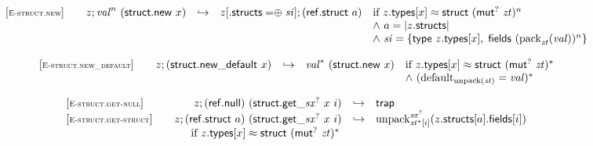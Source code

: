 $$
\begin{array}[t]{@{}lrcl@{}l@{}}
{[\textsc{\scriptsize E{-}struct.new}]} \quad & z ; {{\mathit{val}}^{n}}~(\mathsf{struct{.}new}~x) & \hookrightarrow & z{}[{.}\mathsf{structs} \mathrel{{=}{\oplus}} {\mathit{si}}] ; (\mathsf{ref{.}struct}~a) & \quad
\begin{array}[t]{@{}l@{}}
\mbox{if}~ z{.}\mathsf{types}{}[x] \approx \mathsf{struct}~{({\mathsf{mut}^?}~{\mathit{zt}})^{n}} \\
{\land}~ a = {|z{.}\mathsf{structs}|} \\
{\land}~ {\mathit{si}} = \{ \mathsf{type}~z{.}\mathsf{types}{}[x],\;\allowbreak \mathsf{fields}~{({{\mathrm{pack}}}_{{\mathit{zt}}}({\mathit{val}}))^{n}} \} \\
\end{array} \\
\end{array}
$$

$$
\begin{array}[t]{@{}lrcl@{}l@{}}
{[\textsc{\scriptsize E{-}struct.new\_default}]} \quad & z ; (\mathsf{struct{.}new\_default}~x) & \hookrightarrow & {{\mathit{val}}^\ast}~(\mathsf{struct{.}new}~x) & \quad
\begin{array}[t]{@{}l@{}}
\mbox{if}~ z{.}\mathsf{types}{}[x] \approx \mathsf{struct}~{({\mathsf{mut}^?}~{\mathit{zt}})^\ast} \\
{\land}~ ({{\mathrm{default}}}_{{\mathrm{unpack}}({\mathit{zt}})} = {\mathit{val}})^\ast \\
\end{array} \\
\end{array}
$$

\vspace{1ex}

$$
\begin{array}[t]{@{}lrcl@{}l@{}}
{[\textsc{\scriptsize E{-}struct.get{-}null}]} \quad & z ; (\mathsf{ref{.}null})~({\mathsf{struct{.}get}}{\mathsf{\_}}{{{\mathit{sx}}^?}}~x~i) & \hookrightarrow & \mathsf{trap} \\
{[\textsc{\scriptsize E{-}struct.get{-}struct}]} \quad & z ; (\mathsf{ref{.}struct}~a)~({\mathsf{struct{.}get}}{\mathsf{\_}}{{{\mathit{sx}}^?}}~x~i) & \hookrightarrow & {{{{\mathrm{unpack}}}_{{{\mathit{zt}}^\ast}{}[i]}^{{{\mathit{sx}}^?}}}}{(z{.}\mathsf{structs}{}[a]{.}\mathsf{fields}{}[i])} &  \\
& \multicolumn{4}{@{}l@{}}{\quad
\quad \mbox{if}~ z{.}\mathsf{types}{}[x] \approx \mathsf{struct}~{({\mathsf{mut}^?}~{\mathit{zt}})^\ast}
} \\
\end{array}
$$

